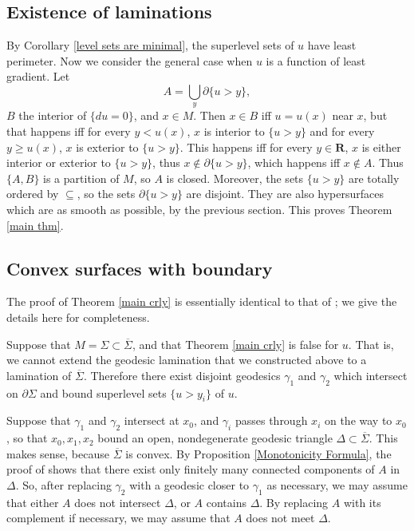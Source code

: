 \documentclass[reqno,12pt,letterpaper]{amsart}
\newcommand{\RR}{\mathbf{R}}
\theoremstyle{definition}
\numberwithin{equation}{section}
\begin{document}
\subsection{Existence of laminations}
By Corollary \ref{level sets are minimal}, the superlevel sets of $u$ have least perimeter.
Now we consider the general case when $u$ is a function of least gradient.
Let
\begin{equation}\label{lamination union}
A = \bigcup_y \partial \{u > y\},
\end{equation} $B$ the interior of $\{du = 0\}$, and $x \in M$.
Then $x \in B$ iff $u = u(x)$ near $x$, but that happens iff for every $y < u(x)$, $x$ is interior to $\{u > y\}$ and for every $y \geq u(x)$, $x$ is exterior to $\{u > y\}$.
This happens iff for every $y \in \RR$, $x$ is either interior or exterior to $\{u > y\}$, thus $x \notin \partial \{u > y\}$, which happens iff $x \notin A$.
Thus $\{A, B\}$ is a partition of $M$, so $A$ is closed.
Moreover, the sets $\{u > y\}$ are totally ordered by $\subseteq$, so the sets $\partial \{u > y\}$ are disjoint.
They are also hypersurfaces which are as smooth as possible, by the previous section.
This proves Theorem \ref{main thm}.

\subsection{Convex surfaces with boundary}
The proof of Theorem \ref{main crly} is essentially identical to that of \cite[Proposition 3.4]{górny2017planar}; we give the details here for completeness.

Suppose that $M = \Sigma \subset \overline \Sigma$, and that Theorem \ref{main crly} is false for $u$.
That is, we cannot extend the geodesic lamination that we constructed above to a lamination of $\overline \Sigma$.
Therefore there exist disjoint geodesics $\gamma_1$ and $\gamma_2$ which intersect on $\partial \Sigma$ and bound superlevel sets $\{u > y_i\}$ of $u$.

Suppose that $\gamma_1$ and $\gamma_2$ intersect at $x_0$, and $\gamma_i$ passes through $x_i$ on the way to $x_0$, so that $x_0, x_1, x_2$ bound an open, nondegenerate geodesic triangle $\Delta \subset \overline \Sigma$. This makes sense, because $\overline \Sigma$ is convex.
By Proposition \ref{Monotonicity Formula}, the proof of \cite[Remark 37.9]{simon1983GMT} shows that there exist only finitely many connected components of $A$ in $\Delta$.
So, after replacing $\gamma_2$ with a geodesic closer to $\gamma_1$ as necessary, we may assume that either $A$ does not intersect $\Delta$, or $A$ contains $\Delta$.
By replacing $A$ with its complement if necessary, we may assume that $A$ does not meet $\Delta$.
\end{document}

